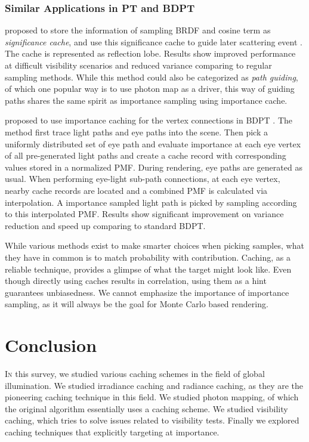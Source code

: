 \documentclass[]{book}
\begin{document}
\subsection{Similar Applications in PT and BDPT}
\label{sec:imp_cache:use_cache:bdpt}
\citeauthor{bashford2012significance} proposed to store the information of sampling BRDF and cosine term as \textit{significance cache}, and use this significance cache to guide later scattering event \cite{bashford2012significance}.
The cache is represented as reflection lobe.
Results show improved performance at difficult visibility scenarios and reduced variance comparing to regular sampling methods.
While this method could also be categorized as \textit{path guiding}, of which one popular way is to use photon map as a driver, this way of guiding paths shares the same spirit as importance sampling using importance cache.

\citeauthor{popov2015probabilistic} proposed to use importance caching for the vertex connections in BDPT \cite{popov2015probabilistic}.
The method first trace light paths and eye paths into the scene.
Then pick a uniformly distributed set of eye path and evaluate importance at each eye vertex of all pre-generated light paths and create a cache record with corresponding values stored in a normalized PMF.
During rendering, eye paths are generated as usual.
When performing eye-light sub-path connections, at each eye vertex, nearby cache records are located and a combined PMF is calculated via interpolation.
A importance sampled light path is picked by sampling according to this interpolated PMF.
Results show significant improvement on variance reduction and speed up comparing to standard BDPT.

While various methods exist to make smarter choices when picking samples, what they have in common is to match probability with contribution.
Caching, as a reliable technique, provides a glimpse of what the target might look like.
Even though directly using caches results in correlation, using them as a hint guarantees unbiasedness.
We cannot emphasize the importance of importance sampling, as it will always be the goal for Monte Carlo based rendering.


\chapter{Conclusion}
\label{chap:conclusion}
\lettrine{I}{n} this survey, we studied various caching schemes in the field of global illumination.
We studied irradiance caching and radiance caching, as they are the pioneering caching technique in this field.
We studied photon mapping, of which the original algorithm essentially uses a caching scheme.
We studied visibility caching, which tries to solve issues related to visibility tests.
Finally we explored caching techniques that explicitly targeting at importance.
\end{document}
